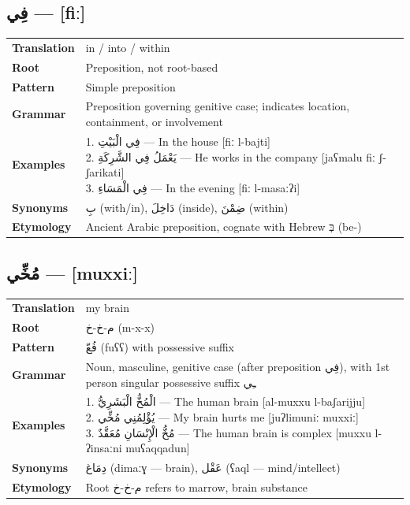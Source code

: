 \documentclass[letterpaper,12pt]{article}
\begin{document}
\subsection{\textarabic{فِي} — [fiː]}
\begin{tabular}{p{3cm}p{10cm}}
\toprule
\textbf{Translation} & in / into / within \\
\textbf{Root} & Preposition, not root-based \\
\textbf{Pattern} & Simple preposition \\
\textbf{Grammar} & Preposition governing genitive case; indicates location, containment, or involvement \\
\midrule
\textbf{Examples} & \makecell[l]{\parbox{9.5cm}{
1. \textarabic{فِي الْبَيْتِ} — In the house [fiː l-bajti]\\
2. \textarabic{يَعْمَلُ فِي الشَّرِكَةِ} — He works in the company [jaʕmalu fiː ʃ-ʃarikati]\\
3. \textarabic{فِي الْمَسَاءِ} — In the evening [fiː l-masaːʔi]
}} \\
\midrule
\textbf{Synonyms} & \textarabic{بِ} (with/in), \textarabic{دَاخِلَ} (inside), \textarabic{ضِمْنَ} (within) \\
\textbf{Etymology} & Ancient Arabic preposition, cognate with Hebrew \texthebrew{בְּ} (be-) \\
\bottomrule
\end{tabular}

\subsection{\textarabic{مُخِّي} — [muxxiː]}
\begin{tabular}{p{3cm}p{10cm}}
\toprule
\textbf{Translation} & my brain \\
\textbf{Root} & \textarabic{م-خ-خ} (m-x-x) \\
\textbf{Pattern} & \textarabic{فُعّ} (fuʕʕ) with possessive suffix \\
\textbf{Grammar} & Noun, masculine, genitive case (after preposition \textarabic{فِي}), with 1st person singular possessive suffix \textarabic{ـِي} \\
\midrule
\textbf{Examples} & \makecell[l]{\parbox{9.5cm}{
1. \textarabic{الْمُخُّ الْبَشَرِيُّ} — The human brain [al-muxxu l-baʃarijju]\\
2. \textarabic{يُؤْلِمُنِي مُخِّي} — My brain hurts me [juʔlimuniː muxxiː]\\
3. \textarabic{مُخُّ الْإِنْسَانِ مُعَقَّدٌ} — The human brain is complex [muxxu l-ʔinsaːni muʕaqqadun]
}} \\
\midrule
\textbf{Synonyms} & \textarabic{دِمَاغ} (dimaːɣ — brain), \textarabic{عَقْل} (ʕaql — mind/intellect) \\
\textbf{Etymology} & Root \textarabic{م-خ-خ} refers to marrow, brain substance \\
\bottomrule
\end{tabular}
\end{document}
